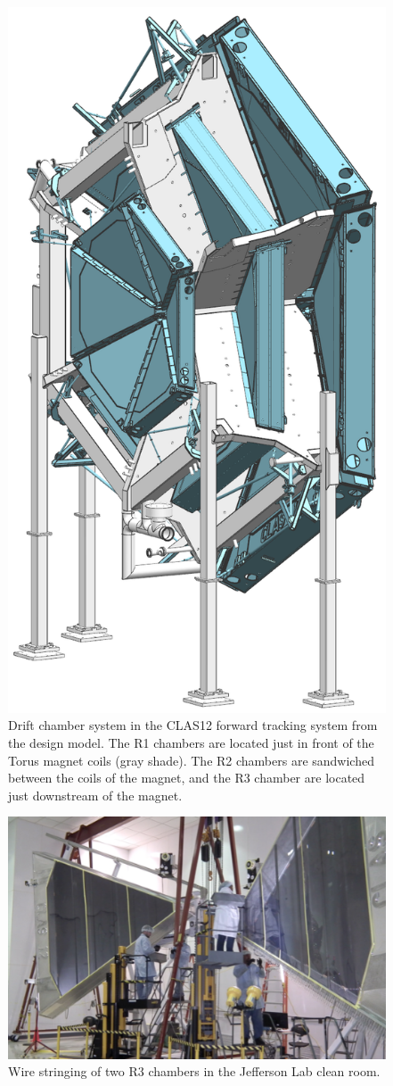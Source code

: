 \documentclass[final,3p,twocolumn]{elsarticle}
\begin{document}
\begin{figure}[htbp!]
\centerline{\includegraphics[width=0.65\columnwidth]{dc-view-4.png}}
\caption{Drift chamber system in the CLAS12 forward tracking system from the design model. The R1 chambers
are located just in front of the Torus magnet coils (gray shade). The R2 chambers are sandwiched between the coils 
of the magnet, and the R3 chamber are located just downstream of the magnet.}
\label{clas12-dc}
\end{figure}

\begin{figure}[htbp!]
\centerline{\includegraphics[width=1.95\columnwidth]{DC-R3.png}}
\caption{Wire stringing of two R3 chambers in the Jefferson Lab clean room.}
\label{dc-stringing}
\end{figure}
\end{document}
